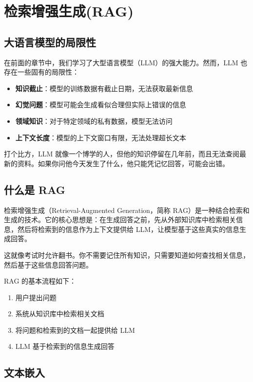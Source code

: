 \chapter{检索增强生成(RAG)}

\section{大语言模型的局限性}

在前面的章节中，我们学习了大型语言模型（LLM）的强大能力。然而，LLM 也存在一些固有的局限性：

\begin{itemize}
    \item \textbf{知识截止}：模型的训练数据有截止日期，无法获取最新信息
    \item \textbf{幻觉问题}：模型可能会生成看似合理但实际上错误的信息
    \item \textbf{领域知识}：对于特定领域的私有数据，模型无法访问
    \item \textbf{上下文长度}：模型的上下文窗口有限，无法处理超长文本
\end{itemize}

打个比方，LLM 就像一个博学的人，但他的知识停留在几年前，而且无法查阅最新的资料。如果你问他今天发生了什么，他只能凭记忆回答，可能会出错。

\section{什么是 RAG}

检索增强生成（Retrieval-Augmented Generation，简称 RAG）是一种结合检索和生成的技术。它的核心思想是：在生成回答之前，先从外部知识库中检索相关信息，然后将检索到的信息作为上下文提供给 LLM，让模型基于这些真实的信息生成回答。

这就像考试时允许翻书。你不需要记住所有知识，只需要知道如何查找相关信息，然后基于这些信息回答问题。

RAG 的基本流程如下：
\begin{enumerate}
    \item 用户提出问题
    \item 系统从知识库中检索相关文档
    \item 将问题和检索到的文档一起提供给 LLM
    \item LLM 基于检索到的信息生成回答
\end{enumerate}

\section{文本嵌入}

